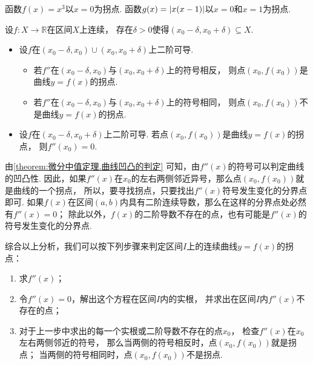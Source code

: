 \begin{example}
函数\(f(x) = x^3\)以\(x=0\)为拐点.
函数\(g(x) = \abs{x(x-1)}\)以\(x=0\)和\(x=1\)为拐点.
\end{example}

\begin{theorem}
设\(f\colon X\to\mathbb{R}\)在区间\(X\)上连续，
存在\(\delta>0\)使得\((x_0-\delta,x_0+\delta) \subseteq X\).
\begin{itemize}
	\item 设\(f\)在\((x_0-\delta,x_0)\cup(x_0,x_0+\delta)\)上二阶可导.
	\begin{itemize}
		\item 若\(f''\)在\((x_0-\delta,x_0)\)与\((x_0,x_0+\delta)\)上的符号相反，
		则点\((x_0,f(x_0))\)是曲线\(y=f(x)\)的拐点.
		\item 若\(f''\)在\((x_0-\delta,x_0)\)与\((x_0,x_0+\delta)\)上的符号相同，
		则点\((x_0,f(x_0))\)不是曲线\(y=f(x)\)的拐点.
	\end{itemize}

	\item 设\(f\)在\((x_0-\delta,x_0+\delta)\)上二阶可导.
	若点\((x_0,f(x_0))\)是曲线\(y=f(x)\)的拐点，
	则\(f''(x_0) = 0\).
\end{itemize}
\end{theorem}

由\cref{theorem:微分中值定理.曲线凹凸的判定} 可知，由\(f''(x)\)的符号可以判定曲线的凹凸性.
因此，如果\(f''(x)\)在\(x_0\)的左右两侧邻近异号，那么点\((x_0,f(x_0))\)就是曲线的一个拐点，
所以，要寻找拐点，只要找出\(f''(x)\)符号发生变化的分界点即可.
如果\(f(x)\)在区间\((a,b)\)内具有二阶连续导数，那么在这样的分界点处必然有\(f''(x)=0\)；
除此以外，\(f(x)\)的二阶导数不存在的点，也有可能是\(f''(x)\)的符号发生变化的分界点.

{\color{red}
综合以上分析，我们可以按下列步骤来判定区间\(I\)上的连续曲线\(y=f(x)\)的拐点：
\begin{enumerate}
	\item 求\(f''(x)\)；

	\item 令\(f''(x) = 0\)，解出这个方程在区间\(I\)内的实根，
	并求出在区间\(I\)内\(f''(x)\)不存在的点；

	\item 对于上一步中求出的每一个实根或二阶导数不存在的点\(x_0\)，
	检查\(f''(x)\)在\(x_0\)左右两侧邻近的符号，
	那么当两侧的符号相反时，点\((x_0,f(x_0))\)就是拐点；
	当两侧的符号相同时，点\((x_0,f(x_0))\)不是拐点.
\end{enumerate}}

